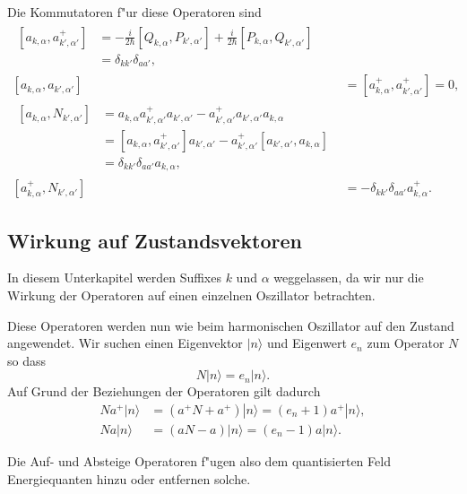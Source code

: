 Die Kommutatoren f"ur diese Operatoren sind
\begin{align*}
\begin{split}
[a_{k,\alpha} , a^+_{k',\alpha'}] &= - \frac{i}{2 \hbar} [Q_{k,\alpha}, P_{k',\alpha'}] + \frac{i}{2 \hbar} [P_{k,\alpha}, Q_{k',\alpha'}] \\
	 &= \delta_{kk'}\delta_{aa'},
\end{split}\\
[a_{k,\alpha} , a_{k',\alpha'}] &= [a^+_{k,\alpha} , a^+_{k',\alpha'}] = 0, \\
\begin{split}
[a_{k,\alpha} , N_{k',\alpha'}] &= a_{k,\alpha} a^+_{k',\alpha'} a_{k',\alpha'} - a^+_{k',\alpha'} a_{k',\alpha'} a_{k,\alpha} \\
	&= [a_{k,\alpha} , a^+_{k',\alpha'}]a_{k',\alpha'} - a^+_{k',\alpha'}[a_{k',\alpha'} , a_{k,\alpha}]\\
	&= \delta_{kk'}\delta_{aa'} a_{k,\alpha},
\end{split} \\
[a^+_{k,\alpha} , N_{k',\alpha'}] &= -\delta_{kk'}\delta_{aa'} a^+_{k,\alpha}.
\end{align*}

\subsection{Wirkung auf Zustandsvektoren}

In diesem Unterkapitel werden Suffixes $k$ und $\alpha$ weggelassen, da wir nur die Wirkung der Operatoren auf einen einzelnen Oszillator betrachten. 

Diese Operatoren werden nun wie beim harmonischen Oszillator auf den Zustand angewendet. Wir suchen einen Eigenvektor $|n\rangle$ und Eigenwert $e_n$ zum Operator $N$ so dass
\begin{equation*}
N|n\rangle = e_n|n\rangle.
\end{equation*}
Auf Grund der Beziehungen der Operatoren gilt dadurch
\begin{align*}
Na^+|n\rangle &= (a^+N + a^+)|n\rangle = (e_n + 1)a^+|n\rangle, \\
Na|n\rangle &= (aN - a)|n\rangle = (e_n - 1)a|n\rangle.
\end{align*}

Die Auf- und Absteige Operatoren f"ugen also dem quantisierten Feld Energiequanten hinzu oder entfernen solche.

